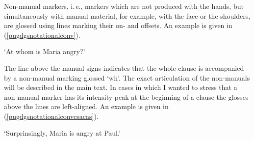 \begin{refsection}
Non-manual markers, i.\,e., markers which are not produced with the hands, but simultaneously with manual material, for example, with the face or the shoulders, are glossed using lines marking their on- and offsets. An example is given in (\ref{pugdgsnotationalconv}).


\begin{exe}
\ex\label{pugdgsnotationalconv}
\glt `At whom is Maria angry?' \label{ex:pugdgsa} 
\end{exe}




\noindent The line above the manual signs indicates that the whole clause is accompanied by a non-manual marking glossed `wh'. The exact articulation of the non-manuals will be described in the main text. In cases in which I wanted to stress that a non-manual marker has its intensity peak at the beginning of a clause the glosses above the lines are left-aligned. An example is given in (\ref{pugdgsnotationalconvcsacas}).

\begin{exe}
\ex\label{pugdgsnotationalconvcsacas}
\glt `Surprinsingly, Maria is angry at Paul.' \label{ex:pugdgsa} 
\end{exe}

\cleardoublepage

\printbibliography[heading=subbibliography]
\end{refsection}